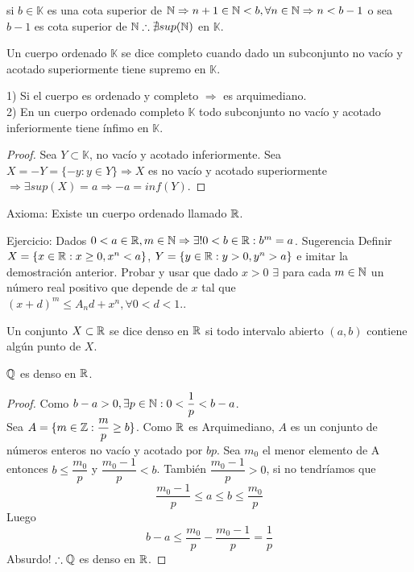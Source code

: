 si $b \in \mathbb{K}$ es una cota superior de $\mathbb{N} \Rightarrow n+1 \in \mathbb{N}<b, \forall n \in \mathbb{N} \Rightarrow n < b-1$ o sea $b-1$ es cota superior de $\mathbb{N} \therefore \nexists sup(\mathbb{N})$ en $\mathbb{K}$.

\begin{definition}
    Un cuerpo ordenado $\mathbb{K}$ se dice completo cuando dado un subconjunto no vacío y acotado superiormente tiene supremo en $\mathbb{K}$.
\end{definition}

\begin{note}
    1) Si el cuerpo es ordenado y completo $\Rightarrow$ es arquimediano. \\
    2) En un cuerpo ordenado completo $\mathbb{K}$ todo subconjunto no vacío y acotado inferiormente tiene ínfimo en $\mathbb{K}$.
    \begin{proof}
        Sea $Y \subset \mathbb{K}$, no vacío y acotado inferiormente. Sea $X = -Y = \{ -y:y \in Y \} \Rightarrow X$ es no vacío y acotado superiormente $\Rightarrow \exists sup(X)=a \Rightarrow -a=inf(Y)$.
    \end{proof}
\end{note}

Axioma: Existe un cuerpo ordenado llamado $\mathbb{R}$.


Ejercicio: Dados $0<a \in \mathbb{R}, m \in \mathbb{N} \Rightarrow \exists! 0<b\in \mathbb{R} : b^m =a$. Sugerencia Definir $X = \{ x \in \mathbb{R} : x\geq0, x^n<a \}$, $Y = \{ y \in \mathbb{R} : y>0, y^n >a \}$ e imitar la demostración anterior. Probar y usar que dado $x>0$ $\exists$ para cada $m \in \mathbb{N}$ un número real positivo que depende de $x$ tal que $(x+d)^m \leq A_nd+x^n, \forall 0<d<1.$.

\begin{definition}
    Un conjunto $X \subset \mathbb{R}$ se dice denso en $\mathbb{R}$ si todo intervalo abierto $(a, b)$ contiene algún punto de $X$.
\end{definition}

\clearpage

\begin{eg}
    $\mathbb{Q}$ es denso en $\mathbb{R}$.
    \begin{proof}
        Como $b-a>0, \exists p\in \mathbb{N}: 0 < \dfrac{1}{p}<b-a$. \\
        Sea $A = \{ m \in \mathbb{Z}: \dfrac{m}{p} \geq b \}$. Como $\mathbb{R}$ es Arquimediano, $A$ es un conjunto de números enteros no vacío y acotado por $bp$. Sea $m_0$ el menor elemento de A entonces $b\leq \dfrac{m_0}{p}$ y $\dfrac{m_0-1}{p} <b$. También $\dfrac{m_0-1}{p} > 0$, si no tendríamos que
        \begin{equation}
            \dfrac{m_0-1}{p} \leq a \leq b \leq \dfrac{m_0}{p}
        \end{equation}
        Luego
        \begin{equation}
            b-a \leq \dfrac{m_0}{p} - \dfrac{m_0-1}{p} = \dfrac1p
        \end{equation}
        Absurdo! $\therefore \mathbb{Q}$ es denso en $\mathbb{R}$.
    \end{proof}
\end{eg}

